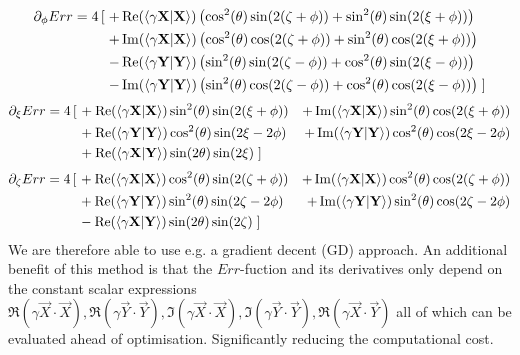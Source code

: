 \documentclass[Master]{subfiles}
\begin{document}
\begin{dmath}\label{math:ABvecsD2}
\begin{aligned}
\partial_{\phi} Err = 
4 \left[\right.
+&\Re(\braket{\gamma\vec{X}}{\vec{X}}) \left(\cos ^2(\theta ) \sin (2 (\zeta + \phi )) + \sin ^2(\theta ) \sin (2 (\xi + \phi )) \right)\\
+&\Im(\braket{\gamma\vec{X}}{\vec{X}}) \left(\cos ^2(\theta ) \cos (2 (\zeta + \phi )) + \sin ^2(\theta ) \cos (2 (\xi + \phi ))\right)\\
-&\Re(\braket{\gamma\vec{Y}}{\vec{Y}}) \left(\sin ^2(\theta ) \sin (2 (\zeta - \phi )) + \cos ^2(\theta ) \sin (2 (\xi - \phi ))\right)\\
-&\Im(\braket{\gamma\vec{Y}}{\vec{Y}}) \left(\sin ^2(\theta ) \cos (2 (\zeta - \phi )) + \cos ^2(\theta ) \cos (2 (\xi - \phi ))\right)\left.\right]\\
\end{aligned}
\end{dmath}
\begin{dmath}\label{math:ABvecsD3}
\begin{aligned}
\partial_{\xi} Err = 
4 \left[\right.
&+\Re(\braket{\gamma\vec{X}}{\vec{X}}) \sin ^2(\theta ) \sin (2 (\xi +\phi ))
&+\Im(\braket{\gamma\vec{X}}{\vec{X}}) \sin ^2(\theta ) \cos (2 (\xi +\phi ))\\
&+\Re(\braket{\gamma\vec{Y}}{\vec{Y}}) \cos ^2(\theta ) \sin (2 \xi -2 \phi )
&+\Im(\braket{\gamma\vec{Y}}{\vec{Y}}) \cos ^2(\theta ) \cos (2 \xi -2 \phi )\\
&+\Re(\braket{\gamma\vec{X}}{\vec{Y}}) \sin (2 \theta ) \sin (2 \xi )
\left.\right]&
\end{aligned}
\end{dmath}
\begin{dmath}\label{math:ABvecsD4}
\begin{aligned}
\partial_{\zeta} Err = 4 \left[\right.
&+\Re(\braket{\gamma\vec{X}}{\vec{X}}) \cos ^2(\theta ) \sin (2 (\zeta +\phi ))
&+\Im(\braket{\gamma\vec{X}}{\vec{X}}) \cos ^2(\theta ) \cos (2 (\zeta +\phi ))\\
&+\Re(\braket{\gamma\vec{Y}}{\vec{Y}}) \sin ^2(\theta ) \sin (2 \zeta -2 \phi )
&+\Im(\braket{\gamma\vec{Y}}{\vec{Y}}) \sin ^2(\theta ) \cos (2 \zeta -2 \phi )\\
&-\Re(\braket{\gamma\vec{X}}{\vec{Y}}) \sin (2 \theta )\sin (2 \zeta ) \left.\right]&
\end{aligned}
\end{dmath}
We are therefore able to use e.g. a gradient decent (GD) approach. An additional benefit of this method is that the $Err$-fuction and its derivatives only depend on the constant scalar expressions  $ \Re(\gamma \vec{X}\cdot \vec{X}),\Re(\gamma \vec{Y}\cdot \vec{Y}),\Im(\gamma \vec{X}\cdot \vec{X}),\Im(\gamma \vec{Y}\cdot \vec{Y}),\Re(\gamma \vec{X}\cdot \vec{Y})$ all of which can be evaluated ahead of optimisation. Significantly reducing the computational cost.\\
\end{document}
